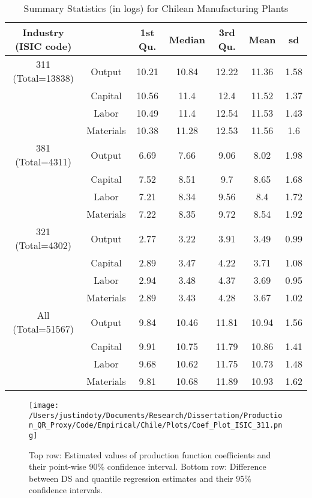 \documentclass[11pt]{article}
\begin{document}
\begin{table}[H]
\centering
\caption{Summary Statistics (in logs) for Chilean Manufacturing Plants}
\begin{tabular}{ccccccc}
  \hline\hline Industry (ISIC code) &   & 1st Qu. & Median & 3rd Qu. & Mean & sd \\ 
  \hline
311 (Total=13838) & Output & 10.21 & 10.84 & 12.22 & 11.36 & 1.58 \\ 
   & Capital & 10.56 & 11.4 & 12.4 & 11.52 & 1.37 \\ 
   & Labor & 10.49 & 11.4 & 12.54 & 11.53 & 1.43 \\ 
   & Materials & 10.38 & 11.28 & 12.53 & 11.56 & 1.6 \\ 
  381 (Total=4311) & Output & 6.69 & 7.66 & 9.06 & 8.02 & 1.98 \\ 
   & Capital & 7.52 & 8.51 & 9.7 & 8.65 & 1.68 \\ 
   & Labor & 7.21 & 8.34 & 9.56 & 8.4 & 1.72 \\ 
   & Materials & 7.22 & 8.35 & 9.72 & 8.54 & 1.92 \\ 
  321 (Total=4302) & Output & 2.77 & 3.22 & 3.91 & 3.49 & 0.99 \\ 
   & Capital & 2.89 & 3.47 & 4.22 & 3.71 & 1.08 \\ 
   & Labor & 2.94 & 3.48 & 4.37 & 3.69 & 0.95 \\ 
   & Materials & 2.89 & 3.43 & 4.28 & 3.67 & 1.02 \\ 
  All (Total=51567) & Output & 9.84 & 10.46 & 11.81 & 10.94 & 1.56 \\ 
   & Capital & 9.91 & 10.75 & 11.79 & 10.86 & 1.41 \\ 
   & Labor & 9.68 & 10.62 & 11.75 & 10.73 & 1.48 \\ 
   & Materials & 9.81 & 10.68 & 11.89 & 10.93 & 1.62 \\ 
   \hline
\end{tabular}
\label{CHLsum}
\end{table} 

\begin{figure}[H]
\centering
\texttt{[image: /Users/justindoty/Documents/Research/Dissertation/Production\_QR\_Proxy/Code/Empirical/Chile/Plots/Coef\_Plot\_ISIC\_311.png]}
\caption{Top row: Estimated values of production function coefficients and their point-wise 90\% confidence interval. Bottom row: Difference between DS and quantile regression estimates and their 95\% confidence intervals.}
\label{fig:CHL311}
\end{figure}
\end{document}
